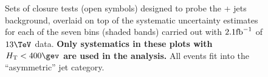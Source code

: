 \clearpage
\begin{figure}[h!]
  \begin{center}
     ~~
     \\
     ~~
     \\
    \caption{Sets of closure tests (open symbols) designed to probe
      the \znunu + jets background, overlaid on top of
      the systematic uncertainty estimates for each of the seven
      \scalht bins (shaded bands) carried out with $2.1\text{fb}^{-1}$ of
      $13\tev$ data. {\bf Only systematics in these plots with
      $\scalht<400\gev$ are used in the analysis.} All events fit 
      into the ``asymmetric'' jet
      category.}
    \label{fig:ZinvclosureDataAsymlt400}
  \end{center} 
\end{figure}

